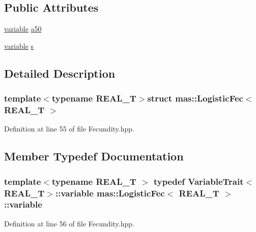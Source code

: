 \subsection*{Public Attributes}
\begin{DoxyCompactItemize}
\item 
\hyperlink{structmas_1_1_logistic_fec_ad7f5125508249b28ef04b00d022d8055}{variable} \hyperlink{structmas_1_1_logistic_fec_a6e72c6de9d6e0a69fea2c9fe580bedb3}{a50}
\item 
\hyperlink{structmas_1_1_logistic_fec_ad7f5125508249b28ef04b00d022d8055}{variable} \hyperlink{structmas_1_1_logistic_fec_a69f62cb6f7c2e37af6c8cebc041e864e}{s}
\end{DoxyCompactItemize}


\subsection{Detailed Description}
\subsubsection*{template$<$typename R\-E\-A\-L\-\_\-\-T$>$struct mas\-::\-Logistic\-Fec$<$ R\-E\-A\-L\-\_\-\-T $>$}



Definition at line 55 of file Fecundity.\-hpp.



\subsection{Member Typedef Documentation}
\hypertarget{structmas_1_1_logistic_fec_ad7f5125508249b28ef04b00d022d8055}{
\subsubsection[{variable}]{\setlength{\rightskip}{0pt plus 5cm}template$<$typename R\-E\-A\-L\-\_\-\-T $>$ typedef {\bf Variable\-Trait}$<$R\-E\-A\-L\-\_\-\-T$>$\-::{\bf variable} {\bf mas\-::\-Logistic\-Fec}$<$ R\-E\-A\-L\-\_\-\-T $>$\-::{\bf variable}}}\label{structmas_1_1_logistic_fec_ad7f5125508249b28ef04b00d022d8055}


Definition at line 56 of file Fecundity.\-hpp.



